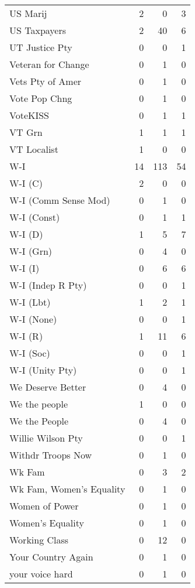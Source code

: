 \begin{supertabular}{lrrr}
US Marij & 2 & 0 & 3\\
US Taxpayers & 2 & 40 & 6\\
UT Justice Pty & 0 & 0 & 1\\
Veteran for Change & 0 & 1 & 0\\
Vets Pty of Amer & 0 & 1 & 0\\
Vote Pop Chng & 0 & 1 & 0\\
VoteKISS & 0 & 1 & 1\\
VT Grn & 1 & 1 & 1\\
VT Localist & 1 & 0 & 0\\
W-I & 14 & 113 & 54\\
W-I (C) & 2 & 0 & 0\\
W-I (Comm Sense Mod) & 0 & 1 & 0\\
W-I (Const) & 0 & 1 & 1\\
W-I (D) & 1 & 5 & 7\\
W-I (Grn) & 0 & 4 & 0\\
W-I (I) & 0 & 6 & 6\\
W-I (Indep R Pty) & 0 & 0 & 1\\
W-I (Lbt) & 1 & 2 & 1\\
W-I (None) & 0 & 0 & 1\\
W-I (R) & 1 & 11 & 6\\
W-I (Soc) & 0 & 0 & 1\\
W-I (Unity Pty) & 0 & 0 & 1\\
We Deserve Better & 0 & 4 & 0\\
We the people & 1 & 0 & 0\\
We the People & 0 & 4 & 0\\
Willie Wilson Pty & 0 & 0 & 1\\
Withdr Troops Now & 0 & 1 & 0\\
Wk Fam & 0 & 3 & 2\\
Wk Fam, Women's Equality & 0 & 1 & 0\\
Women of Power & 0 & 1 & 0\\
Women's Equality & 0 & 1 & 0\\
Working Class & 0 & 12 & 0\\
Your Country Again & 0 & 1 & 0\\
your voice hard & 0 & 1 & 0\\
\bottomrule
\end{supertabular}
